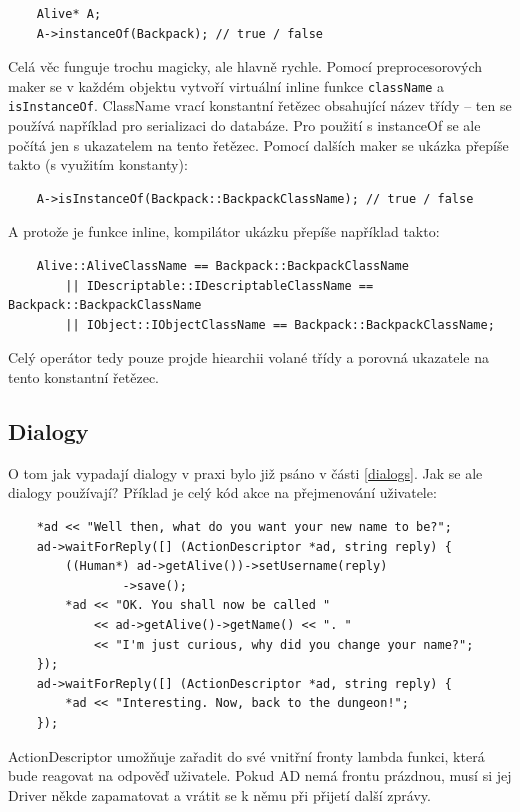 \documentclass[11pt, a4paper]{article}
\begin{document}
\begin{lstlisting}
	Alive* A;
	A->instanceOf(Backpack); // true / false
\end{lstlisting}

\noindent Celá věc funguje trochu magicky, ale hlavně rychle. Pomocí preprocesorových maker se v každém objektu vytvoří virtuální inline funkce \texttt{className} a \texttt{isInstanceOf}. ClassName vrací konstantní řetězec obsahující název třídy -- ten se používá například pro serializaci do databáze. Pro použití s instanceOf se ale počítá jen s ukazatelem na tento řetězec. Pomocí dalších maker se ukázka přepíše takto (s využitím konstanty):

\begin{lstlisting}
	A->isInstanceOf(Backpack::BackpackClassName); // true / false
\end{lstlisting}

\noindent A protože je funkce inline, kompilátor ukázku přepíše například takto:

\begin{lstlisting}
	Alive::AliveClassName == Backpack::BackpackClassName 
		|| IDescriptable::IDescriptableClassName == Backpack::BackpackClassName 
		|| IObject::IObjectClassName == Backpack::BackpackClassName;
\end{lstlisting}

\noindent Celý operátor tedy pouze projde hiearchii volané třídy a porovná ukazatele na tento konstantní řetězec.

\subsection{Dialogy}

O tom jak vypadají dialogy v praxi bylo již psáno v části \ref{dialogs}. Jak se ale dialogy používají? Příklad je celý kód akce na přejmenování uživatele:

\begin{lstlisting}
	*ad << "Well then, what do you want your new name to be?";
	ad->waitForReply([] (ActionDescriptor *ad, string reply) {
		((Human*) ad->getAlive())->setUsername(reply)
				->save();
		*ad << "OK. You shall now be called " 
			<< ad->getAlive()->getName() << ". "
		    << "I'm just curious, why did you change your name?";
	});
	ad->waitForReply([] (ActionDescriptor *ad, string reply) {
		*ad << "Interesting. Now, back to the dungeon!";
	});
\end{lstlisting}

\noindent ActionDescriptor umožňuje zařadit do své vnitřní fronty lambda funkci, která bude reagovat na odpověď uživatele. Pokud AD nemá frontu prázdnou, musí si jej Driver někde zapamatovat a vrátit se k němu při přijetí další zprávy.
\end{document}
